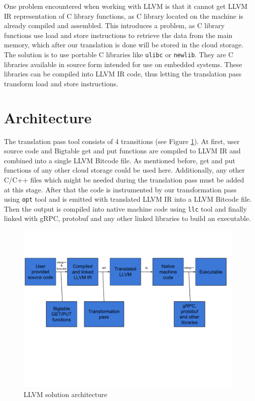 \documentclass[bsc,frontabs,twoside,singlespacing,parskip,deptreport]{infthesis}     %
\begin{document}
One problem encountered when working with LLVM is that it cannot get LLVM IR representation of C library functions, as C library located on the machine is already compiled and assembled. This introduces a problem, as C library functions use load and store instructions to retrieve the data from the main memory, which after our translation is done will be stored in the cloud storage. The solution is to use portable C libraries like \texttt{ulibc} or \texttt{newlib}. They are C libraries available in source form intended for use on embedded systems. These libraries can be compiled into LLVM IR code, thus letting the translation pass transform load and store instructions.

\section{Architecture}
\label{architecture}

The translation pass tool consists of 4 transitions (see Figure \ref{fig:architecture}). At first, user source code and Bigtable get and put functions are compiled to LLVM IR and combined into a single LLVM Bitcode file. As mentioned before, get and put functions of any other cloud storage could be used here. Additionally, any other C/C++ files which might be needed during the translation pass must be added at this stage. After that the code is instrumented by our transformation pass using \texttt{opt} tool and is emitted with translated LLVM IR into a LLVM Bitcode file. Then the output is compiled into native machine code using \texttt{llc} tool and finally linked with gRPC, protobuf and any other linked libraries to build an executable.

\begin{figure}[H]
\centering
\includegraphics[width=1\textwidth]{images/architecture}
\caption{LLVM solution architecture}
\label{fig:architecture}
\end{figure}
\end{document}
